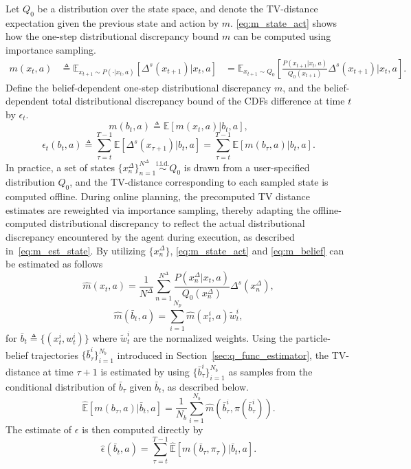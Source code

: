 \documentclass[acmlarge, manuscript, screen, review, natbib=false, oneside]{acmart}
\begin{document}
Let $Q_0$ be a distribution over the state space, and denote the TV-distance expectation given the previous state and action by $m$. \eqref{eq:m_state_act} shows how the one-step distributional discrepancy bound $m$ can be computed using importance sampling.
\begin{equation}
	\begin{aligned}
		m(x_t, a) &\triangleq \mathbb{E}_{x_{t+1} \sim P(\cdot | x_t, a)}[\Delta^s(x_{t+1})|x_t, a]
		&=\mathbb{E}_{x_{t+1} \sim Q_0}[\frac{P(x_{t+1}|x_t, a)}{Q_0(x_{t+1})}\Delta^s(x_{t+1})|x_t, a].
	\end{aligned}
	\label{eq:m_state_act}
\end{equation} 
Define the belief-dependent one-step distributional discrepancy $m$, and the belief-dependent total distributional discrepancy bound of the CDFs difference at time $t$ by $\epsilon_t$.
\begin{equation}\label{eq:m_belief}
	m(b_t, a) \triangleq \mathbb{E}[m(x_t, a)|b_t, a],
\end{equation}
\begin{equation}
	\epsilon_t(b_t, a) \triangleq \sum_{\tau=t}^{T-1} \mathbb{E}[\Delta^s(x_{\tau+1})|b_t, a] = \sum_{\tau=t}^{T-1} \mathbb{E}[m(b_\tau, a)|b_t, a].
\end{equation}
In practice, a set of states $\{x_n^\Delta\}_{n=1}^{N^\Delta} \overset{\text{i.i.d.}}{\sim} Q_0$ is drawn from a user-specified distribution $Q_0$, and the TV-distance corresponding to each sampled state is computed offline. During online planning, the precomputed TV distance estimates are reweighted via importance sampling, thereby adapting the offline-computed distributional discrepancy to reflect the actual distributional discrepancy encountered by the agent during execution, as described in~\eqref{eq:m_est_state}. By utilizing $\{x_n^\Delta\}$, \eqref{eq:m_state_act} and \eqref{eq:m_belief} can be estimated as follows \begin{equation}\label{eq:m_est_state}
	\hat{m}(x_t, a)=\frac{1}{N^\Delta}\sum_{n=1}^{N^\Delta} \frac{P(x_n^\Delta|x_t, a)}{Q_0(x_n^\Delta)}\Delta^s(x_n^\Delta),
\end{equation}
\begin{equation}
	\hat{m}(\bar{b}_t, a)=\sum_{i=1}^{N_p} \hat{m}(x_t^i, a)\tilde{w}_{t}^i,
\end{equation}
for $\bar{b}_t\triangleq \{(x_t^i, w_t^i)\}$ where $\tilde{w}_t^i$ are the normalized weights. Using the particle-belief trajectories $\{\bar{b}_\tau^i\}_{i=1}^{N_b}$ introduced in Section~\ref{sec:q_func_estimator}, the TV-distance at time $\tau+1$ is estimated by using $\{\bar{b}_\tau^i\}_{i=1}^{N_b}$ as samples from the conditional distribution of $\bar{b}_\tau$ given $\bar{b}_t$, as described below.
\begin{equation}
	\hat{\mathbb{E}}[m(b_\tau, a)|\bar{b}_t, a] = \frac{1}{N_b} \sum_{i=1}^{N_b} \hat{m}(\bar{b}_\tau^{i}, \pi(\bar{b}_\tau^{i})).
\end{equation}
The estimate of $\epsilon$ is then computed directly by
\begin{equation}\label{eq:eps_estimator}
	\hat{\epsilon}(\bar{b}_t, a)=\sum_{\tau=t}^{T-1} \hat{\mathbb{E}}[m(\bar{b}_\tau, \pi_\tau)|\bar{b}_t, a].
\end{equation}
\end{document}
